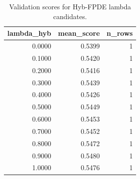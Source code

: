 \begin{table}[t]
\caption{Validation scores for Hyb-FPDE lambda candidates.}
\label{tab:lambda_distribution_computed}
\centering
\begin{tabular}{rrr}
\toprule
lambda\_hyb & mean\_score & n\_rows \\
\midrule
0.0000 & 0.5399 & 1 \\
0.1000 & 0.5420 & 1 \\
0.2000 & 0.5416 & 1 \\
0.3000 & 0.5439 & 1 \\
0.4000 & 0.5426 & 1 \\
0.5000 & 0.5449 & 1 \\
0.6000 & 0.5453 & 1 \\
0.7000 & 0.5452 & 1 \\
0.8000 & 0.5472 & 1 \\
0.9000 & 0.5480 & 1 \\
1.0000 & 0.5476 & 1 \\
\bottomrule
\end{tabular}

\end{table}
